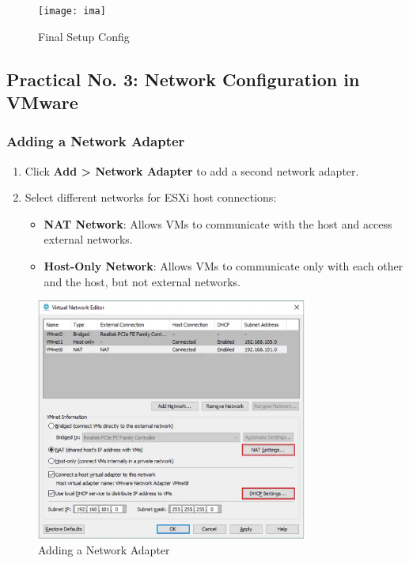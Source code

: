 \documentclass[a4paper,12pt]{article}
\begin{document}
\begin{figure}[H]
    \centering
    \texttt{[image: ima]}  %
    \caption{Final Setup Config}
\end{figure}

\subsection{Practical No. 3: Network Configuration in VMware}

\subsubsection{Adding a Network Adapter}
\begin{enumerate}
    \item Click \textbf{Add > Network Adapter} to add a second network adapter.
    \item Select different networks for ESXi host connections:
    \begin{itemize}
        \item \textbf{NAT Network}: Allows VMs to communicate with the host and access external networks.
        \item \textbf{Host-Only Network}: Allows VMs to communicate only with each other and the host, but not external networks.
    \end{itemize}
\end{enumerate}

\begin{figure}[H]
    \centering
    \includegraphics[width=0.8\textwidth]{images/adapter_config.png}  %
    \caption{Adding a Network Adapter}
\end{figure}
\end{document}
